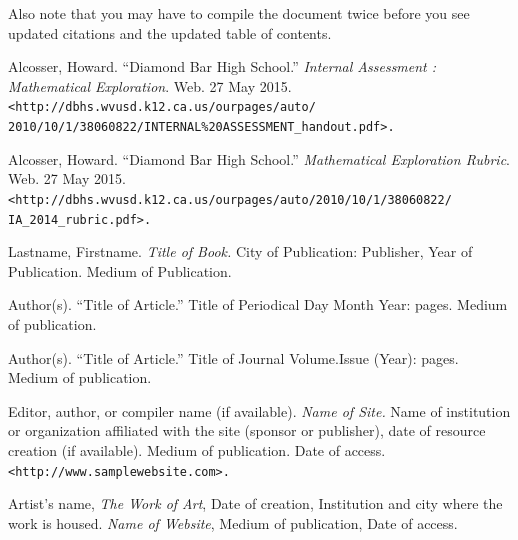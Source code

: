 \documentclass[11pt, letterpaper]{article}
\begin{document}
Also note that you may have to compile the document twice before you see updated citations and the updated table of contents.

\newpage
\begin{thebibliography}{} %

    Alcosser, Howard. 
    ``Diamond Bar High School.''
    \textit{Internal Assessment : Mathematical Exploration}. 
    Web. 27 May 2015.
    \texttt{<http://dbhs.wvusd.k12.ca.us/ourpages/auto/\\2010/10/1/38060822/INTERNAL\%20ASSESSMENT\_handout.pdf>.}

    Alcosser, Howard. 
    ``Diamond Bar High School.'' 
    \textit{Mathematical Exploration Rubric}. 
    Web. 27 May 2015.
    \texttt{<http://dbhs.wvusd.k12.ca.us/ourpages/auto/2010/10/1/38060822/\\IA\_2014\_rubric.pdf>.}

    Lastname, Firstname. 
    \textit{Title of Book.} 
    City of Publication: 
    Publisher, 
    Year of Publication. 
    Medium of Publication. %

    Author(s). 
    ``Title of Article.'' 
    Title of Periodical 
    Day Month Year: 
    pages. 
    Medium of publication.

    Author(s). 
    ``Title of Article.'' 
    Title of Journal 
    Volume.Issue (Year): 
    pages. 
    Medium of publication.

    Editor, author, or compiler name (if available). 
    \textit{Name of Site.} 
    Name of institution or organization affiliated with the site (sponsor or publisher), 
    date of resource creation (if available). 
    Medium of publication. 
    Date of access.
    \texttt{<http://www.samplewebsite.com>.}

    Artist's name, 
    \textit{The Work of Art}, 
    Date of creation, 
    Institution and city where the work is housed. 
    \textit{Name of  Website}, 
    Medium of publication, 
    Date of access.
    
\end{thebibliography}
\end{document}
